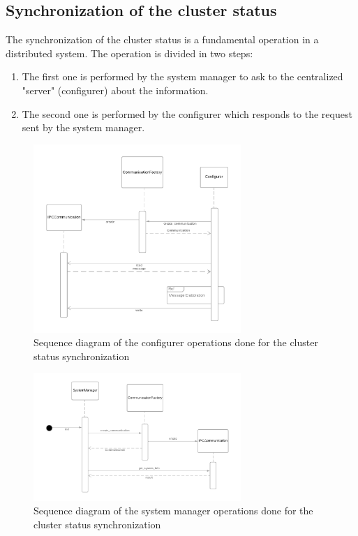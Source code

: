 \subsection{Synchronization of the cluster status}

The synchronization of the cluster status is a fundamental operation in a
distributed system.
The operation is divided in two steps:

\begin{enumerate}
    \item   The first one is performed by the system manager to ask to the
            centralized "server" (configurer) about the information. 
    \item   The second one is performed by the configurer which responds to
            the request sent by the system manager.
\end{enumerate}

\begin{figure}[H]
    \centering
    \includegraphics[width=0.7\textwidth]{Figures/sequence_diagram_cluster_status_configurer.png}
    \caption{Sequence diagram of the configurer operations done for the cluster
             status synchronization}
\end{figure}

\begin{figure}[H]
    \centering
    \includegraphics[width=0.7\textwidth]{Figures/sequence_diagram_cluster_status_system_manager.png}
    \caption{Sequence diagram of the system manager operations done for the
             cluster status synchronization}
\end{figure}

